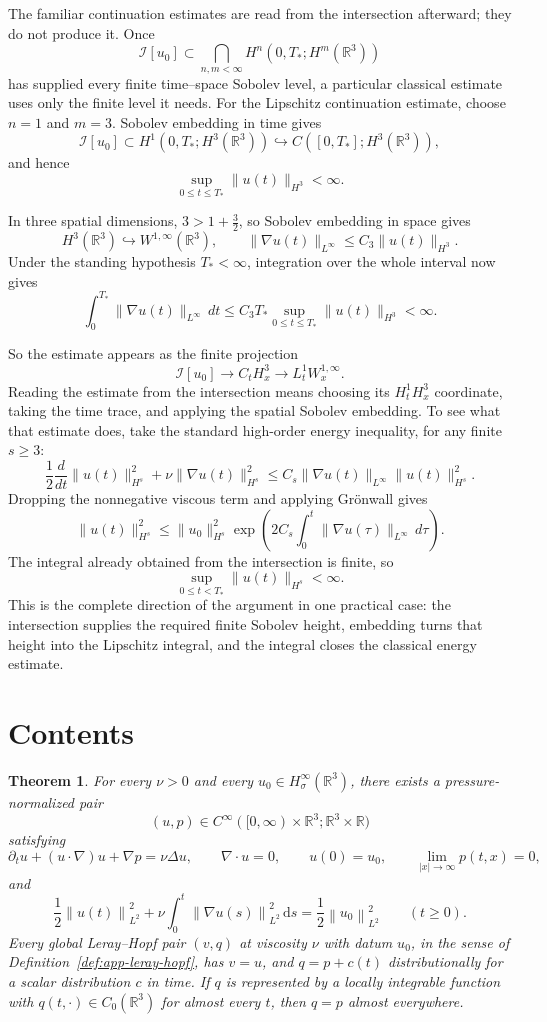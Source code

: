 \documentclass[11pt]{article}
\makeatletter
\newtheorem*{maintheorem}{Theorem}
\theoremstyle{definition}
\theoremstyle{remark}
\newcommand{\R}{\mathbb R}
\newcommand{\HsSigma}{H^\infty_\sigma}
\newcommand{\cI}{\mathcal I}
\newcommand{\norm}[1]{\left\lVert #1\right\rVert}
\newcommand{\abs}[1]{\left|#1\right|}
\newcommand{\dd}{\,\mathrm d}
\renewcommand\tableofcontents{%
  \section*{Contents}%
  \@mkboth{\MakeUppercase{Contents}}{\MakeUppercase{Contents}}%
  \@starttoc{toc}%
}
\makeatother
\begin{document}
The familiar continuation estimates are read from the intersection afterward;
they do not produce it.  Once
\[
\cI[u_0]
\subset
\bigcap_{n,m<\infty}H^n(0,T_*;H^m(\R^3))
\]
has supplied every finite time--space Sobolev level, a particular classical
estimate uses only the finite level it needs.  For the Lipschitz continuation
estimate, choose \(n=1\) and \(m=3\).  Sobolev embedding in time gives
\[
\cI[u_0]
\subset
H^1(0,T_*;H^3(\R^3))
\hookrightarrow
C([0,T_*];H^3(\R^3)),
\]
and hence
\[
\sup_{0\le t\le T_*}\|u(t)\|_{H^3}<\infty.
\]

In three spatial dimensions, \(3>1+\frac32\), so Sobolev embedding in space
gives
\[
H^3(\R^3)\hookrightarrow W^{1,\infty}(\R^3),
\qquad
\|\nabla u(t)\|_{L^\infty}
\le C_3\|u(t)\|_{H^3}.
\]
Under the standing hypothesis \(T_*<\infty\), integration over the whole
interval now gives
\[
\int_0^{T_*}\|\nabla u(t)\|_{L^\infty}\,dt
\le
C_3T_*\sup_{0\le t\le T_*}\|u(t)\|_{H^3}
<\infty.
\]

So the estimate appears as the finite projection
\[
\boxed{
\cI[u_0]
\longrightarrow
C_tH_x^3
\longrightarrow
L_t^1W_x^{1,\infty}.
}
\]
Reading the estimate from the intersection means choosing its
\(H_t^1H_x^3\) coordinate, taking the time trace, and applying the spatial
Sobolev embedding.  To see what that estimate does, take the standard
high-order energy inequality, for any finite \(s\ge3\):
\[
\frac12\frac{d}{dt}\|u(t)\|_{H^s}^2
+\nu\|\nabla u(t)\|_{H^s}^2
\le
C_s\|\nabla u(t)\|_{L^\infty}\|u(t)\|_{H^s}^2.
\]
Dropping the nonnegative viscous term and applying Gr\"onwall gives
\[
\|u(t)\|_{H^s}^2
\le
\|u_0\|_{H^s}^2
\exp\!\left(
2C_s\int_0^t\|\nabla u(\tau)\|_{L^\infty}\,d\tau
\right).
\]
The integral already obtained from the intersection is finite, so
\[
\boxed{
\sup_{0\le t<T_*}\|u(t)\|_{H^s}<\infty.
}
\]
This is the complete direction of the argument in one practical case:
the intersection supplies the required finite Sobolev height, embedding turns
that height into the Lipschitz integral, and the integral closes the classical
energy estimate.
\endgroup
\clearpage
\fi


\clearpage

\begingroup
\small
\tableofcontents
\endgroup
\clearpage

\begin{maintheorem}
For every \(\nu>0\) and every \(u_0\in\HsSigma(\R^3)\), there exists a
pressure-normalized pair
\[
 (u,p)\in C^\infty([0,\infty)\times\R^3;\R^3\times\R)
\]
satisfying
\[
 \partial_tu+(u\cdot\nabla)u+\nabla p=\nu\Delta u,
 \qquad \nabla\cdot u=0,
 \qquad u(0)=u_0,
 \qquad \lim_{\abs{x}\to\infty}p(t,x)=0,
\]
and
\[
 \frac12\norm{u(t)}_{L^2}^2
 +\nu\int_0^t\norm{\nabla u(s)}_{L^2}^2\dd s
 =\frac12\norm{u_0}_{L^2}^2
 \qquad(t\ge0).
\]
Every global Leray--Hopf pair \((v,q)\) at viscosity \(\nu\) with datum
\(u_0\), in the sense of Definition~\ref{def:app-leray-hopf}, has \(v=u\),
and \(q=p+c(t)\) distributionally for a scalar distribution \(c\) in time.
If \(q\) is represented by a locally integrable function with
\(q(t,\cdot)\in C_0(\R^3)\) for almost every \(t\), then \(q=p\) almost
everywhere.
\end{maintheorem}
\end{document}
